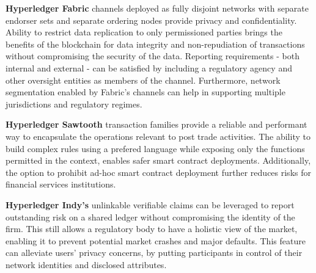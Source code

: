 \textbf{Hyperledger Fabric} channels deployed as fully disjoint networks with separate endorser sets and separate ordering nodes provide privacy and confidentiality. Ability to restrict data replication to only permissioned parties brings the benefits of the blockchain for data integrity and non-repudiation of transactions without compromising the security of the data. Reporting requirements - both internal and external - can be satisfied by including a regulatory agency and other oversight entities as members of the channel. Furthermore, network segmentation enabled by Fabric's channels can help in supporting multiple jurisdictions and regulatory regimes.

\textbf{Hyperledger Sawtooth} transaction families provide a reliable and performant way to encapsulate the operations relevant to post trade activities. The ability to build complex rules using a prefered language while exposing only the functions permitted in the context, enables safer smart contract deployments. Additionally, the option to prohibit ad-hoc smart contract deployment further reduces risks for financial services institutions.

\textbf{Hyperledger Indy's} unlinkable verifiable claims can be leveraged to report outstanding risk on a shared ledger without compromising the identity of the firm. This still allows a regulatory body to have a holistic view of the market, enabling it to prevent potential market crashes and major defaults. This feature can alleviate users' privacy concerns, by putting participants in control of their network identities and disclosed attributes.
